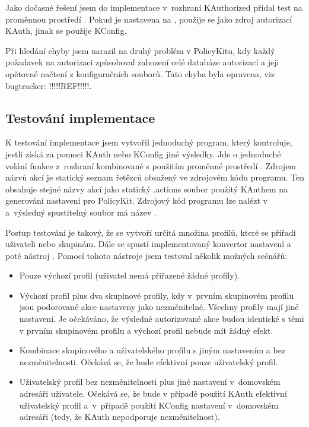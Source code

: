 Jako dočasné řešení jsem do implementace v~rozhraní KAuthorized přidal test na proměnnou prostředí . Pokud je nastavena na , použije se jako zdroj autorizací KAuth, jinak se použije KConfig.

Při hledání chyby jsem narazil na druhý problém v PolicyKitu, kdy každý požadavek na autorizaci způsoboval zahození celé databáze autorizací a jeji opětovné načtení z konfiguračních souborů. Tato chyba byla opravena, viz bugtracker: !!!!!REF!!!!!.

\subsection*{Testování implementace}
K testování implementace jsem vytvořil jednoduchý program, který kontroluje, jestli získá za pomoci KAuth nebo KConfig jiné výsledky. Jde o jednoduché volání funkce  z~rozhraní  kombinované s použitím proměnné prostředí . Zdrojem názvů akcí je statický seznam řetězců obsažený ve zdrojovém kódu programu. Ten obsahuje stejné názvy akcí jako statický .actions soubor použitý KAuthem na generování nastavení pro PolicyKit. Zdrojový kód programu lze nalézt v~ a~výsledný spustitelný soubor má název .

Postup testování je takový, že se vytvoří určitá množina profilů, které se přiřadí uživateli nebo skupinám. Dále se spustí implementovaný konvertor nastavení  a poté nástroj . Pomocí tohoto nástroje jsem testoval několik možných scénářů:

\begin{itemize}
\item Pouze výchozí profil (uživatel nemá přiřazené žádné profily).
\item Výchozí profil plus dva skupinové profily, kdy v~prvním skupinovém profilu jsou podorované akce nastaveny jako nezměnitelné. Všechny profily mají jiné nastavení. Je očekáváno, že výsledné autorizované akce budou identické s těmi v prvním skupinovém profilu a výchozí profil nebude mít žádný efekt.
\item Kombinace skupinového a uživatelského profilu s jiným nastavením a bez nezměnitelnosti. Očekává se, že bude efektivní pouze uživatelský profil.
\item Uživatelský profil bez nezměnitelnosti plus jiné nastavení v~domovském adresáři uživatele. Očekává se, že bude v případě použití KAuth efektivní uživatelský profil a~v~případě použití KConfig nastavení v~domovském adresáři (tedy, že KAuth nepodporuje nezměnitelnost).
\end{itemize}


